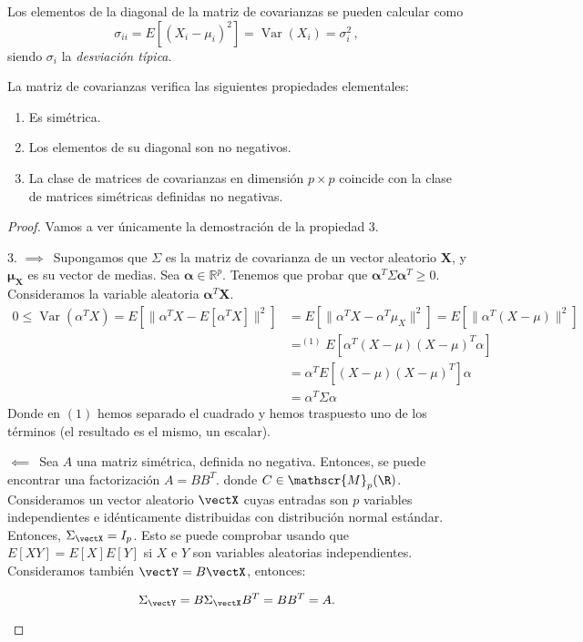 \begin{nota}
  Los elementos de la diagonal de la matriz de covarianzas se pueden calcular como \[\sigma_{ii}=E\left[(X_i - \mu_i)^2\right] = \operatorname{Var}(X_i) = \sigma_i^2\,,\]siendo $\sigma_i$ la \emph{desviación típica}.
\end{nota}

\begin{nprop}
  La matriz de covarianzas verifica las siguientes propiedades elementales:
  \begin{enumerate}
    \item Es simétrica.
    \item Los elementos de su diagonal son no negativos.
    \item La clase de matrices de covarianzas en dimensión $p\times p$ coincide con la clase de matrices simétricas definidas no negativas.
    \end{enumerate}
  \end{nprop}
\begin{proof}
  Vamos a ver únicamente la demostración de la propiedad 3.
  \begin{nlist}
    \item[3.] $\boxed{\implies}\,$ Supongamos que $\Sigma$ es la matriz de covarianza de un vector aleatorio $\boldsymbol X$, y $\boldsymbol \mu_{\boldsymbol X}$ es su vector de medias. Sea $\boldsymbol \alpha \in \mathbb R^p$. Tenemos que probar que $\boldsymbol \alpha^T \Sigma \boldsymbol \alpha^T \geq 0$. Consideramos la variable aleatoria $\boldsymbol \alpha^T \boldsymbol X$. \begin{align*}
      0 \leq \operatorname{Var}(\alpha^T X) = E\left[\|\alpha^T X - E[\alpha^T X]\|^2\right] &= E\left[\|\alpha^T X - \alpha^T \mu_X\|^2\right] = E\left[\|\alpha^T(X-\mu)\|^2\right]\\ 
        &=^{(1)} E\left[\alpha^T(X-\mu)(X-\mu)^T \alpha\right] \\
        &= \alpha^T E\left[(X-\mu)(X-\mu)^T\right] \alpha \\
        &= \alpha^T \Sigma \alpha
    \end{align*} Donde en $(1)$ hemos separado el cuadrado y hemos traspuesto uno de los términos (el resultado es el mismo, un escalar).

    $\boxed{\impliedby}\,$ Sea $A$ una matriz simétrica, definida no negativa. Entonces, se puede encontrar una factorización $A = B B^T$. donde $C \in \mathscr{M}_{p}(\R)$.
    Consideramos un vector aleatorio $\vectX$ cuyas entradas son $p$ variables independientes e idénticamente distribuidas con distribución normal estándar. Entonces, $\Sigma_{\vectX} = I_p$. Esto se puede comprobar usando que $E[XY] = E[X]E[Y]$ si $X$ e $Y$ son variables aleatorias independientes. Consideramos también $\vectY = B\vectX$, entonces:

    \[
       \Sigma_{\vectY} = B\Sigma_{\vectX} B^T = B B^T = A
    .\]

  \end{nlist}
\end{proof}

